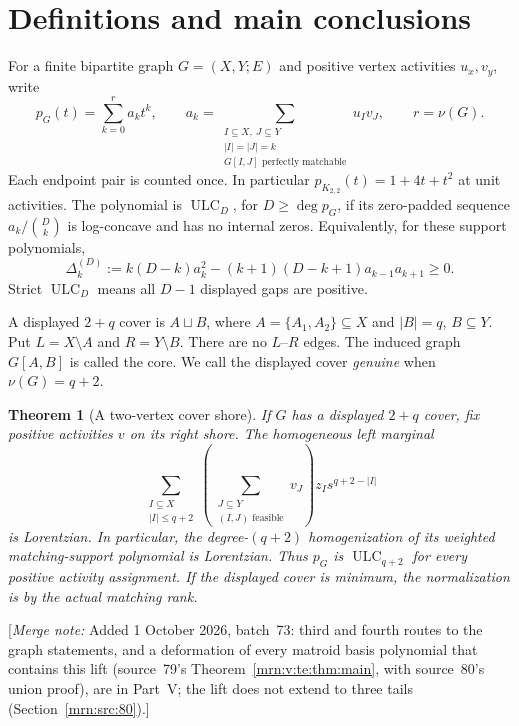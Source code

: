 \documentclass[11pt,a4paper]{article}
\newtheorem{theorem}{Theorem}[section]
\theoremstyle{remark}\newtheorem{remark}[theorem]{Remark}
\newcommand{\ULC}{\operatorname{ULC}}      %
\newcommand{\mnote}[1]{[\textit{Merge note:} #1]}
\begin{document}
\section{Definitions and main conclusions}\label{mrn:src:74}
For a finite bipartite graph $G=(X,Y;E)$ and positive vertex activities $u_x,v_y$, write
\[
 p_G(t)=\sum_{k=0}^{r}a_kt^k,
 \qquad
 a_k=\sum_{\substack{I\subseteq X,\ J\subseteq Y\\|I|=|J|=k\\G[I,J]\text{ perfectly matchable}}}u_Iv_J,
 \qquad r=\nu(G).
\]
Each endpoint pair is counted once. In particular $p_{K_{2,2}}(t)=1+4t+t^2$ at unit activities. The polynomial is $\ULC_D$, for $D\ge\deg p_G$, if its zero-padded sequence $a_k/\binom Dk$ is log-concave and has no internal zeros. Equivalently, for these support polynomials,
\begin{equation}\label{mrn:w:rf:eq:gap}
 \Delta_k^{(D)}:=k(D-k)a_k^2-(k+1)(D-k+1)a_{k-1}a_{k+1}\ge0.
\end{equation}
Strict $\ULC_D$ means all $D-1$ displayed gaps are positive.

A displayed $2+q$ cover is $A\sqcup B$, where $A=\{A_1,A_2\}\subseteq X$ and $|B|=q$, $B\subseteq Y$. Put $L=X\setminus A$ and $R=Y\setminus B$. There are no $L$--$R$ edges. The induced graph $G[A,B]$ is called the core. We call the displayed cover \emph{genuine} when $\nu(G)=q+2$.

\begin{theorem}[A two-vertex cover shore]\label{mrn:w:rf:thm:main}
If $G$ has a displayed $2+q$ cover, fix positive activities $v$ on its right shore. The homogeneous left marginal
\[
 \sum_{\substack{I\subseteq X\\|I|\le q+2}}\left(\sum_{\substack{J\subseteq Y\\(I,J)\text{ feasible}}}v_J\right)z_I s^{q+2-|I|}
\]
is Lorentzian. In particular, the degree-$(q+2)$ homogenization of its weighted matching-support polynomial is Lorentzian. Thus $p_G$ is $\ULC_{q+2}$ for every positive activity assignment. If the displayed cover is minimum, the normalization is by the actual matching rank.
\end{theorem}
\mnote{Added 1 October 2026, batch~73: third and fourth routes to the graph
statements, and a deformation of every matroid basis polynomial that contains
this lift (source~79's Theorem~\ref{mrn:v:te:thm:main}, with source~80's union
proof), are in Part~V; the lift does not extend to three tails
(Section~\ref{mrn:src:80}).}
\end{document}
